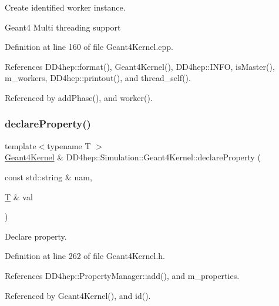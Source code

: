 Create identified worker instance. 

Geant4 Multi threading support 

Definition at line 160 of file Geant4\+Kernel.\+cpp.



References D\+D4hep\+::format(), Geant4\+Kernel(), D\+D4hep\+::\+I\+N\+FO, is\+Master(), m\+\_\+workers, D\+D4hep\+::printout(), and thread\+\_\+self().



Referenced by add\+Phase(), and worker().

\hypertarget{class_d_d4hep_1_1_simulation_1_1_geant4_kernel_ac267696721115fda0d13cc9a4337214e}{}\label{class_d_d4hep_1_1_simulation_1_1_geant4_kernel_ac267696721115fda0d13cc9a4337214e} 
\subsubsection{\texorpdfstring{declare\+Property()}{declareProperty()}\hspace{0.1cm}{\footnotesize\ttfamily [1/2]}}
{\footnotesize\ttfamily template$<$typename T $>$ \\
\hyperlink{class_d_d4hep_1_1_simulation_1_1_geant4_kernel}{Geant4\+Kernel} \& D\+D4hep\+::\+Simulation\+::\+Geant4\+Kernel\+::declare\+Property (\begin{DoxyParamCaption}\item[{const std\+::string \&}]{nam,  }\item[{\hyperlink{class_t}{T} \&}]{val }\end{DoxyParamCaption})}



Declare property. 



Definition at line 262 of file Geant4\+Kernel.\+h.



References D\+D4hep\+::\+Property\+Manager\+::add(), and m\+\_\+properties.



Referenced by Geant4\+Kernel(), and id().

\hypertarget{class_d_d4hep_1_1_simulation_1_1_geant4_kernel_a7729a86ca944cc34f9e42447650905f1}{}\label{class_d_d4hep_1_1_simulation_1_1_geant4_kernel_a7729a86ca944cc34f9e42447650905f1} 

